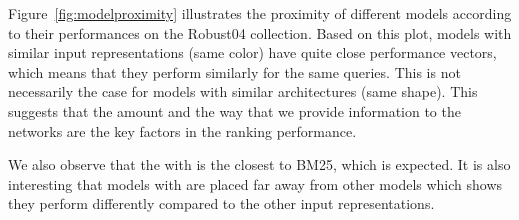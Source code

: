 Figure~\ref{fig:modelproximity} illustrates the proximity of different models according to their performances on the Robust04 collection. Based on this plot, models with similar input representations (same color) have quite close performance vectors, which means that they perform similarly for the same queries. This is not necessarily the case for models with similar architectures (same shape). 
This suggests that the amount and the way that we provide information to the networks are the key factors in the ranking performance. 

We also observe that the \modelone with \feedones is the closest to BM25, which is expected. 
It is also interesting that models with \feedthree are placed far away from other models which shows they perform differently compared to the other input representations.


